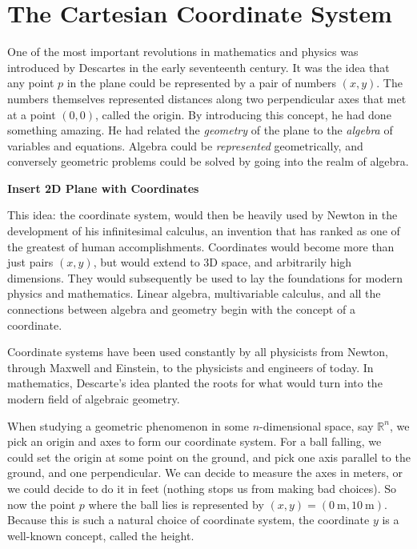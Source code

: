 \documentclass[../master.tex]{subfiles}
\begin{document}
	
	\section{The Cartesian Coordinate System} %
	\label{sec:Cartesian}
	
	
	
	One of the most important revolutions in mathematics and physics was introduced by Descartes in the early seventeenth century. It was the idea that any point $p$ in the plane could be represented by a pair of numbers $(x,y)$. The numbers themselves represented distances along two perpendicular axes that met at a point $(0,0)$, called the origin. By introducing this concept, he had done something amazing. He had related the \emph{geometry} of the plane to the \emph{algebra} of variables and equations. Algebra could be \emph{represented} geometrically, and conversely geometric problems could be solved by going into the realm of algebra. 
	
	\textbf{Insert 2D Plane with Coordinates}
	
	This idea: the coordinate system, would then be heavily used by Newton in the development of his infinitesimal calculus, an invention that has ranked as one of the greatest of human accomplishments. Coordinates would become more than just pairs $(x,y)$, but would extend to 3D space, and arbitrarily high dimensions. They would subsequently be used to lay the foundations for modern physics and mathematics. Linear algebra, multivariable calculus, and all the connections between algebra and geometry begin with the concept of a coordinate.
	
	Coordinate systems have been used constantly by all physicists from Newton, through Maxwell and Einstein, to the physicists and engineers of today. In mathematics, Descarte's idea planted the roots for what would turn into the modern field of algebraic geometry. 
	
	When studying a geometric phenomenon in some $n$-dimensional space, say $\mathbb{R}^n$, we pick an origin and axes to form our coordinate system. For a ball falling, we could set the origin at some point on the ground, and pick one axis parallel to the ground, and one perpendicular. We can decide to measure the axes in meters, or we could decide to do it in feet (nothing stops us from making bad choices). So now the point $p$ where the ball lies is represented by $(x,y)=(0~ \mathrm m,10~ \mathrm m)$. Because this is such a natural choice of coordinate system, the coordinate $y$ is a well-known concept, called the height.
	
\end{document}
